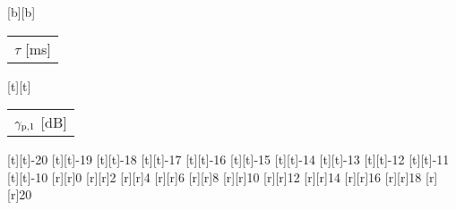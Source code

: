 %    
%
%
%
[b][b]{\fontsize{8}{12}\selectfont \color[rgb]{0,0,0}\setlength{\tabcolsep}{0pt}\begin{tabular}{c}$\tau$ [ms]\end{tabular}}%
[t][t]{\fontsize{8}{12}\selectfont \color[rgb]{0,0,0}\setlength{\tabcolsep}{0pt}\begin{tabular}{c}${\gamma}_{\text{p,1}}$ [dB]\end{tabular}}%
%
\fontsize{8}{12}%
\selectfont%
%
[t][t]{-20}%
[t][t]{-19}%
[t][t]{-18}%
[t][t]{-17}%
[t][t]{-16}%
[t][t]{-15}%
[t][t]{-14}%
[t][t]{-13}%
[t][t]{-12}%
[t][t]{-11}%
[t][t]{-10}%
%
[r][r]{0}%
[r][r]{2}%
[r][r]{4}%
[r][r]{6}%
[r][r]{8}%
[r][r]{10}%
[r][r]{12}%
[r][r]{14}%
[r][r]{16}%
[r][r]{18}%
[r][r]{20}%
%
%
